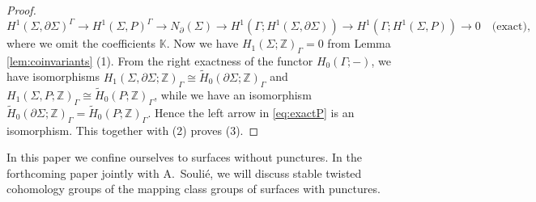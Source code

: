 \documentclass[a4paper,12pt, twoside]{amsart}
\theoremstyle{definition}
\theoremstyle{remark}
\numberwithin{equation}{section}
\newcommand\bK{{\mathbb{K}}}
\newcommand\bZ{{\mathbb{Z}}}
\newcommand\pa{\partial}
\begin{document}
\begin{proof}
\begin{equation}\label{eq:exactP}
H^1(\Sigma, \pa\Sigma)^\Gamma \to H^1(\Sigma, P)^\Gamma \to 
N_\pa(\Sigma) \to H^1(\Gamma; H^1(\Sigma, \pa\Sigma))
\to H^1(\Gamma; H^1(\Sigma, P)) \to 0\quad \text{(exact)},
\end{equation}
where we omit the coefficients $\bK$. 
Now we have $H_1(\Sigma; \bZ)_\Gamma = 0$ from Lemma \ref{lem:coinvariants} (1). From the right exactness of the functor $H_0(\Gamma; -)$, we have isomorphisms $H_1(\Sigma, \pa\Sigma; \bZ)_\Gamma \cong \widetilde{H}_0(\pa\Sigma; \bZ)_\Gamma$ and $H_1(\Sigma, P; \bZ)_\Gamma \cong \widetilde{H}_0(P; \bZ)_\Gamma$, while we have an isomorphism $\widetilde{H}_0(\pa\Sigma; \bZ)_\Gamma = \widetilde{H}_0(P; \bZ)_\Gamma$. 
Hence the left arrow in \eqref{eq:exactP} is an isomorphism. This together with (2) proves (3). 
\end{proof}


In this paper we confine ourselves to surfaces without punctures.
In the forthcoming paper \cite{KS4} jointly with A.\ Souli\'e, we will discuss stable twisted cohomology groups of the mapping class groups of surfaces with punctures. \par



%
%
\end{document}
